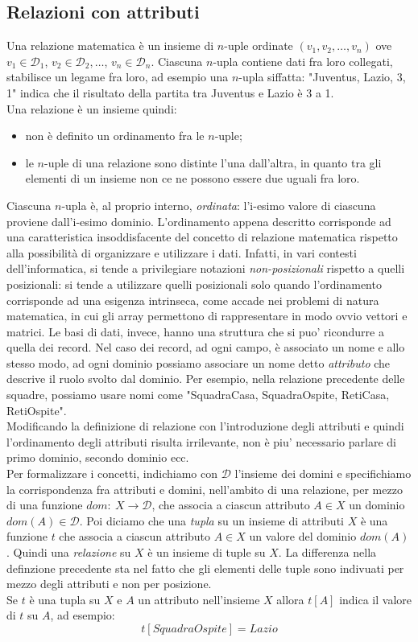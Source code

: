 \documentclass[12pt]{report}
\begin{document}
	\subsection{Relazioni con attributi}
	Una relazione matematica è un insieme di $n$-uple ordinate $(v_1, v_2, \dots, v_n)$ ove $v_1 \in \mathcal{D}_1$, $v_2 \in \mathcal{D}_2, \dots$, $v_n \in \mathcal{D}_n$. Ciascuna $n$-upla contiene dati fra loro collegati, stabilisce un legame fra loro, ad esempio una $n$-upla siffatta: "Juventus, Lazio, 3, 1" indica che il risultato della partita tra Juventus e Lazio è 3 a 1. \\
	Una relazione è un insieme quindi:
	\begin{itemize}
		\item non è definito un ordinamento fra le $n$-uple;
		\item le $n$-uple di una relazione sono distinte l'una dall'altra, in quanto tra gli elementi di un insieme non ce ne possono essere due uguali fra loro.
	\end{itemize}
	Ciascuna $n$-upla è, al proprio interno, \textit{ordinata}: l'i-esimo valore di ciascuna proviene dall'i-esimo dominio. L'ordinamento appena descritto corrisponde ad una caratteristica insoddisfacente del concetto di relazione matematica rispetto alla possibilità di organizzare e utilizzare i dati. Infatti, in vari contesti dell'informatica, si tende a privilegiare notazioni \textit{non-posizionali} rispetto a quelli posizionali: si tende a utilizzare quelli posizionali solo quando l'ordinamento corrisponde ad una esigenza intrinseca, come accade nei problemi di natura matematica, in cui gli array permettono di rappresentare in modo ovvio vettori e matrici. Le basi di dati, invece, hanno una struttura che si puo' ricondurre a quella dei record. Nel caso dei record, ad ogni campo, è associato un nome e allo stesso modo, ad ogni dominio possiamo associare un nome detto \textit{attributo} che descrive il ruolo svolto dal dominio. Per esempio, nella relazione precedente delle squadre, possiamo usare nomi come "SquadraCasa, SquadraOspite, RetiCasa, RetiOspite". \\
	Modificando la definizione di relazione con l'introduzione degli attributi e quindi l'ordinamento degli attributi risulta irrilevante, non è piu' necessario parlare di primo dominio, secondo dominio ecc. \\
	Per formalizzare i concetti, indichiamo con $\mathcal{D}$ l'insieme dei domini e specifichiamo la corrispondenza fra attributi e domini, nell'ambito di una relazione, per mezzo di una funzione $dom:\ X \to \mathcal{D}$, che associa a ciascun attributo $A \in X$ un dominio $dom(A) \in \mathcal{D}$. Poi diciamo che una \textit{tupla} su un insieme di attributi $X$ è una funzione $t$ che associa a ciascun attributo $A \in X$ un valore del dominio $dom(A)$. Quindi una \textit{relazione} su $X$ è un insieme di tuple su $X$. La differenza nella definzione precedente sta nel fatto che gli elementi delle tuple sono indivuati per mezzo degli attributi e non per posizione. \\
	Se $t$ è una tupla su $X$ e $A$ un attributo nell'insieme $X$ allora $t[A]$ indica il valore di $t$ su $A$, ad esempio:
	\[
	t[SquadraOspite] = Lazio
	\]
\end{document}
